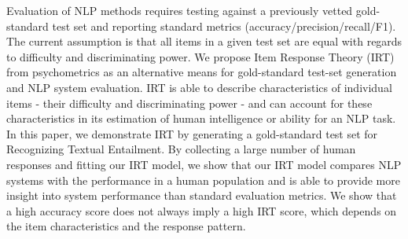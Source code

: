 Evaluation of NLP methods requires testing against a previously vetted gold-standard test set and reporting standard metrics (accuracy/precision/recall/F1). The current assumption is that all items in a given test set are equal with regards to difficulty and discriminating power. We propose Item Response Theory (IRT) from psychometrics as an alternative means for gold-standard test-set generation and NLP system evaluation. IRT is able to describe characteristics of individual items - their difficulty and discriminating power - and can account for these characteristics in its estimation of human intelligence or ability for an NLP task. In this paper, we demonstrate IRT by generating a gold-standard test set for Recognizing Textual Entailment. By collecting a large number of human responses and fitting our IRT model, we show that our IRT model compares NLP systems with the performance in a human population and is able to provide more insight into system performance than standard evaluation metrics. We show that a high accuracy score does not always imply a high IRT score, which depends on the item characteristics and the response pattern.
